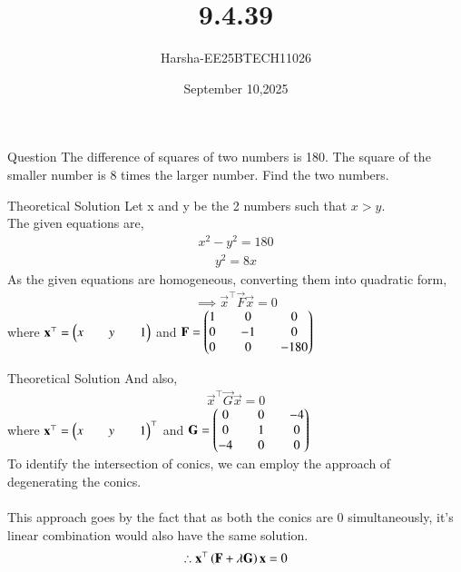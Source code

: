 \documentclass{beamer}
\title %
{9.4.39}
\date{September 10,2025}
\author %
{Harsha-EE25BTECH11026}
\begin{document}
\frame{\titlepage}


\begin{frame}{Question}
The difference of squares of two numbers is 180. The square of the smaller number is 8 times the larger number. Find the two numbers.
\end{frame}

\begin{frame}{Theoretical Solution}
Let x and y be the 2 numbers such that $x>y$.\\
The given equations are,
\begin{align}
    x^2-y^2=180
\end{align}
\begin{align}
    y^2=8x
\end{align}
As the given equations are homogeneous, converting them into quadratic form,
\begin{align}
    \implies \vec{x}^{\top}\vec{F}\vec{x}=0
\end{align}
where $\mathbf{x}^{\top}=\begin{pmatrix}x&&y&&1\end{pmatrix}$ and $\mathbf{F}=\begin{pmatrix}1&&0&&0\\0&&-1&&0\\0&&0&&-180\end{pmatrix}$\\

\end{frame}

\begin{frame}{Theoretical Solution}
And also,
\begin{align}
    \vec{x}^{\top}\vec{G}\vec{x}=0
\end{align}
where $\mathbf{x}^{\top}=\begin{pmatrix}x&&y&&1\end{pmatrix}^{\top}$ and $\mathbf{G}=\begin{pmatrix}0&&0&&-4\\0&&1&&0\\-4&&0&&0\end{pmatrix}$\\
To identify the intersection of conics, we can employ the approach of degenerating the conics.\\
\\
This approach goes by the fact that as both the conics are 0 simultaneously, it's linear combination would also have the same solution.
\begin{align}
    \therefore \mathbf{x}^{\top}\left(\mathbf{F}+\lambda\mathbf{G}\right)\mathbf{x}=0
\end{align}
\end{frame}
\end{document}
